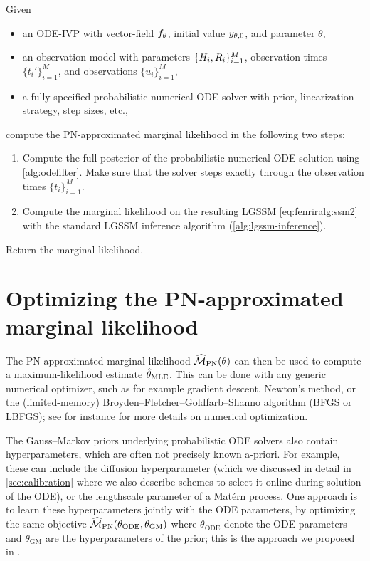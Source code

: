 \documentclass{mimosis}
\begin{document}
\begin{alg}
\label{alg:fenrir}
Given
\begin{itemize}[nosep]
\item an ODE-IVP with vector-field \(\vf_\theta\), initial value \(y_{\theta,0}\), and parameter \(\theta\),
\item an observation model with parameters \(\{H_i, R_i\}_{i=1}^M\), observation times \(\{t_i'\}_{i=1}^M\), and observations \(\{u_i\}_{i=1}^M\),
\item a fully-specified probabilistic numerical ODE solver with prior, linearization strategy, step sizes, etc.,
\end{itemize}
compute the PN-approximated marginal likelihood in the following two steps:
\begin{enumerate}[nosep]
\item Compute the full posterior of the probabilistic numerical ODE solution
using \cref{alg:odefilter}.
Make sure that the solver steps exactly through the observation times \(\{t_i\}_{i=1}^M\).
\item Compute the marginal likelihood on the resulting LGSSM \cref{eq:fenriralg:ssm2} with the standard LGSSM inference algorithm (\ref{alg:lgssm-inference}).
\end{enumerate}
Return the marginal likelihood.
\end{alg}
\section{Optimizing the PN-approximated marginal likelihood}
\label{sec:org79684b5}
The PN-approximated marginal likelihood \(\widehat{\mathcal{M}}_\text{PN}(\theta)\) can then be used to compute a maximum-likelihood estimate \(\hat{\theta}_\text{MLE}\).
This can be done with any generic numerical optimizer, such as
for example gradient descent,
Newton's method,
or the (limited-memory) Broyden--Fletcher--Goldfarb--Shanno algorithm (BFGS or LBFGS);
see for instance \textcite{nocedal1999numerical} for more details on numerical optimization.
\begin{remark}
\label{remark:fenrir:hyperparameters}
The Gauss--Markov priors underlying probabilistic ODE solvers also contain hyperparameters, which are often not precisely known a-priori.
For example, these can include the diffusion hyperparameter (which we discussed in detail in \cref{sec:calibration} where we also describe schemes to select it online during solution of the ODE), or the lengthscale parameter of a Matérn process.
One approach is to learn these hyperparameters jointly with the ODE parameters, by optimizing the same objective \(\widehat{\mathcal{M}}_\text{PN}(\theta_\text{ODE}, \theta_\text{GM})\) where
\(\theta_\text{ODE}\) denote the ODE parameters and \(\theta_\text{GM}\) are the hyperparameters of the prior;
this is the approach we proposed in
\fenrir{}.
\end{remark}
\end{document}
